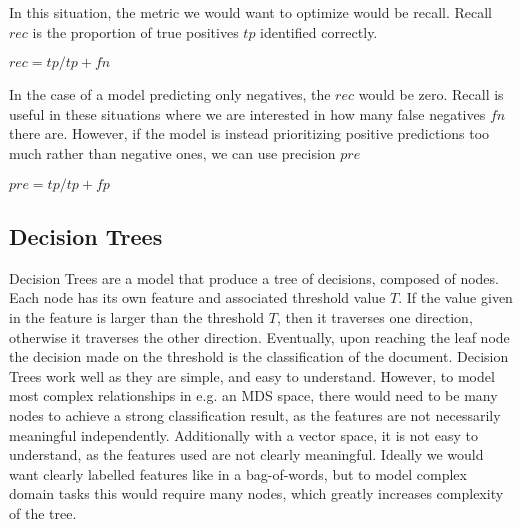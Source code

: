 In this situation, the metric we would want to optimize would be recall. Recall ${rec}$ is the proportion of true positives ${tp}$ identified correctly. 

${rec} = {tp} / {tp} + {fn}$

In the case of a model predicting only negatives, the ${rec}$ would be zero. Recall is useful in these situations where we are interested in how many false negatives ${fn}$ there are. However, if the model is instead prioritizing positive predictions too much rather than negative ones, we can use precision ${pre}$

${pre} = {tp} / {tp} + {fp}$



\subsection{Decision Trees}\label{bg:trees}

Decision Trees are a model that produce a tree of decisions, composed of nodes. Each node has its own feature and associated threshold value $T$.  If the value given in the feature is larger than the threshold $T$, then it traverses one direction, otherwise it traverses the other direction. Eventually, upon reaching the leaf node the decision made on the threshold is the classification of the document. Decision Trees work well as they are simple, and easy to understand. However, to model most complex relationships in e.g. an MDS space, there would need to be many nodes to achieve a strong classification result, as the features are not necessarily meaningful independently. Additionally with a vector space, it is not easy to understand, as the features used are not clearly meaningful. Ideally we would want clearly labelled features like in a bag-of-words, but to model complex domain tasks this would require many nodes, which greatly increases complexity of the tree. 








